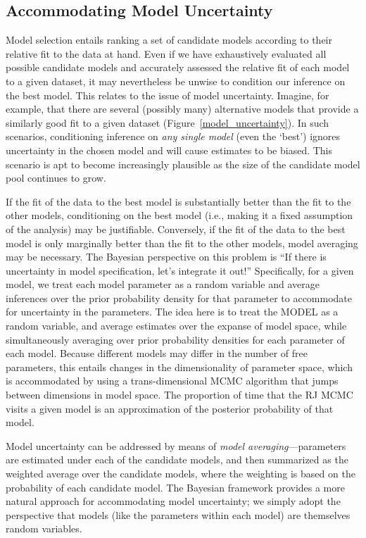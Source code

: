 \subsection{Accommodating Model Uncertainty}
Model selection entails ranking a set of candidate models according to their relative fit to the data at hand.
Even if we have exhaustively evaluated all possible candidate models and accurately assessed the relative fit of each model to a given dataset, it may nevertheless be unwise to condition our inference on the best model.
This relates to the issue of model uncertainty.
Imagine, for example, that there are several (possibly many) alternative models that provide a similarly good fit to a given dataset (Figure~\ref{model_uncertainty}).
In such scenarios, conditioning inference on \textit{any single model} (even the `best') ignores uncertainty in the chosen model and will cause estimates to be biased.
This scenario is apt to become increasingly plausible as the size of the candidate model pool continues to grow.

If the fit of the data to the best model is substantially better than the fit to the other models, conditioning on the best model (i.e., making it a fixed assumption of the analysis) may be justifiable. 
Conversely, if the fit of the data to the best model is only marginally better than the fit to the other models, model averaging may be necessary. 
The Bayesian perspective on this problem is ``If there is uncertainty in model specification, let's integrate it out!'' 
Specifically, for a given model, we treat each model parameter as a random variable and average inferences over the prior probability density for that parameter to accommodate for uncertainty in the parameters. 
The idea here is to treat the MODEL as a random variable, and average estimates over the expanse of model space, while simultaneously averaging over prior probability densities for each parameter of each model.
Because different models may differ in the number of free parameters, this entails changes in the dimensionality of parameter space, which is accommodated by using a trans-dimensional MCMC algorithm that jumps between dimensions in model space. 
The proportion of time that the RJ MCMC visits a given model is an approximation of the posterior probability of that model.


Model uncertainty can be addressed by means of \textit{model averaging}---parameters are estimated under each of the candidate models, and then summarized as the weighted average over the candidate models, where the weighting is based on the probability of each candidate model.
The Bayesian framework provides a more natural approach for accommodating model uncertainty; we simply adopt the perspective that models (like the parameters within each model) are themselves random variables.

